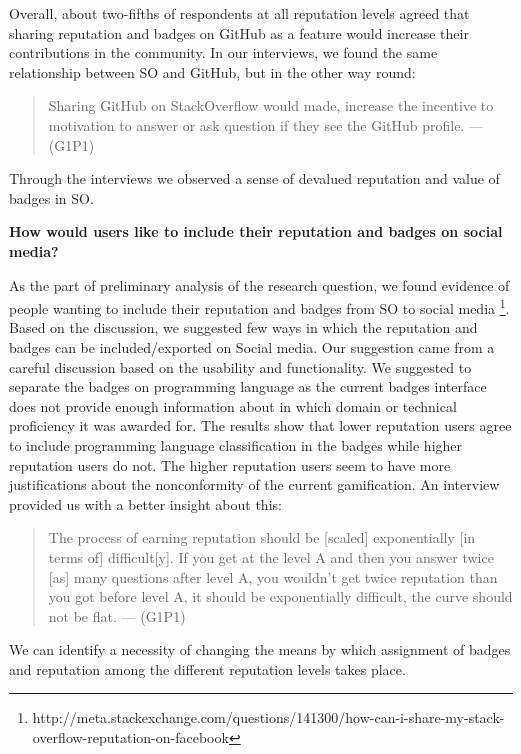 \documentclass{sigchi}
\begin{document}
Overall, about two-fifths of respondents at all reputation levels agreed that sharing reputation and badges on GitHub as a feature would increase their contributions in the community. In our interviews, we found the same relationship between SO and GitHub, but in the other way round:

\begin{quote}
Sharing GitHub on StackOverflow would made, increase the incentive to motivation to answer or ask question if they see the GitHub profile. --- (G1P1)
\end{quote}

Through the interviews we observed a sense of devalued reputation and value of badges in SO.

\textbf{How would users like to include their reputation and badges on social media?}

As the part of preliminary analysis of the research question, we found evidence of people wanting to include their reputation and badges from SO to social media \footnote{http://meta.stackexchange.com/questions/141300/how-can-i-share-my-stack-overflow-reputation-on-facebook}. Based on the discussion, we suggested few ways in which the reputation and badges can be included/exported on Social media. Our suggestion came from a careful discussion based on the usability and functionality. We suggested to separate the badges on programming language as the current badges interface does not provide enough information about in which domain or technical proficiency it was awarded for. The results show that lower reputation users agree to include programming language classification in the badges while higher reputation users do not. The higher reputation users seem to have more justifications about the nonconformity of the current gamification. An interview provided us with  a better insight about this:

\begin{quote}
The process of earning reputation should be [scaled] exponentially [in terms of] difficult[y]. If you get at the level A and then you answer twice [as] many questions after level A, you wouldn’t get twice reputation than you got before level A, it should be exponentially difficult, the curve should not be flat. --- (G1P1)
\end{quote}

We can identify a necessity of changing the means by which assignment of  badges and reputation among the different reputation levels takes place.
\end{document}
